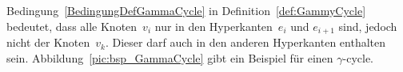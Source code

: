 Bedingung~\ref{BedingungDefGammaCycle} in Definition~\ref{def:GammyCycle} bedeutet, dass alle Knoten~$v_i$ nur in den Hyperkanten~$e_i$ und $e_{i+1}$ sind, jedoch nicht der Knoten~$v_k$. Dieser darf auch in den anderen Hyperkanten enthalten sein. Abbildung~\ref{pic:bsp_GammaCycle} gibt ein Beispiel für einen $\gamma$-cycle.

\begin{figure}[htbp]
    \centering
\end{figure}
